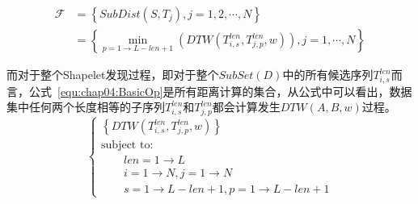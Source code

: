 \begin{equation}
\label{equ:chap04:dtwreuse}
\begin{split}
\mathcal{F} &=\left\lbrace SubDist(S,T_j),j=1,2,\cdots,N\right\rbrace \\ 
&=\left\lbrace \min_{p=1\to L-len+1}(DTW(T_{i,s}^{len},T_{j,p}^{len},w)),j=1,\cdots,N\right\rbrace
\end{split}
\end{equation}

而对于整个Shapelet发现过程，即对于整个$SubSet(D)$中的所有候选序列$T_{i,s}^{len}$而言，公式~\ref{equ:chap04:BasicOp}是所有距离计算的集合，从公式中可以看出，数据集中任何两个长度相等的子序列$T_{i,s}^{len}$和$T_{j,p}^{len}$都会计算发生$DTW(A,B,w)$过程。%
\begin{equation}\label{equ:chap04:BasicOp}
\left\{\begin{array}{l}
\left\lbrace DTW(T_{i,s}^{len},T_{j,p}^{len},w) \right\rbrace \\[0.1cm]
\mbox{subject to:}\\[0.1cm]
\qquad len = 1 \to L \\[0.1cm]
\qquad i=1\to N,j=1\to N\\[0.1cm]
\qquad s=1\to L-len+1,p=1\to L-len+1 
\end{array}\right.
\end{equation}



